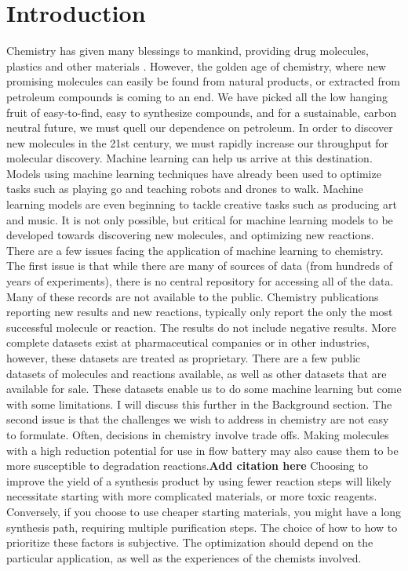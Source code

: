\chapter{Introduction}
\thispagestyle{plain}

Chemistry has given many blessings to mankind, providing drug molecules, plastics and other materials \cite{napoleons_buttons}. However, the golden age of chemistry, where new promising molecules can easily be found from natural products, or extracted from petroleum compounds is coming to an end. We have picked all the low hanging fruit of easy-to-find, easy to synthesize compounds, and for a sustainable, carbon neutral future, we must quell our dependence on petroleum.
In order to discover new molecules in the 21st century, we must rapidly increase our throughput for molecular discovery. Machine learning can help us arrive at this destination. Models using machine learning techniques have already been used to optimize tasks such as playing go and teaching robots and drones to walk. Machine learning models are even beginning to tackle creative tasks such as producing art and music. 
It is not only possible, but critical for machine learning models to be developed towards discovering new molecules, and optimizing new reactions.
There are a few issues facing the application of machine learning to chemistry. The first issue is that while there are many of sources of data (from hundreds of years of experiments), there is no central repository for accessing all of the data. Many of these records are not available to the public. Chemistry publications reporting new results and new reactions, typically only report the only the most successful molecule or reaction. The results do not include negative results. More complete datasets exist at pharmaceutical companies or in other industries, however, these datasets are treated as  proprietary. There are a few public datasets of molecules and reactions available, as well as other datasets that are available for sale. These datasets enable us to do some machine learning but come with some limitations. I will discuss this further in the Background section.
The second issue is that the challenges we wish to address in chemistry are not easy to formulate. Often, decisions in chemistry involve trade offs. Making molecules with a high reduction potential for use in flow battery may also cause them to be more susceptible to degradation reactions.\textbf{Add citation here} Choosing to improve the yield of a synthesis product by using fewer reaction steps will likely necessitate starting with more complicated materials, or more toxic reagents. Conversely, if you choose to use cheaper starting materials, you might have a long synthesis path, requiring multiple purification steps. The choice of how to how to prioritize these factors is subjective. The optimization should depend on the particular application, as well as the experiences of the chemists involved.

